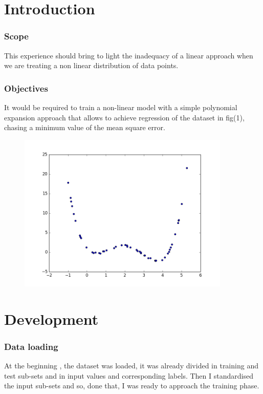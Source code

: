 \documentclass{article}
\begin{document}
			\renewcommand{\lstlistingname}{Code}

			
			\part{Introduction}
			
				\section{Scope}
This experience should bring to light the inadequacy of a linear approach when we are treating a non linear distribution of data points.
				\section{Objectives}
				It would be required to train a non-linear model with a simple polynomial expansion approach that allows to achieve regression of the dataset in fig(1), chasing a minimum value of the mean square error. 
				\begin{center}
\begin{figure}
\centering
\includegraphics[width=0.9\textwidth]{data-plot}
\caption{}
\label{fig:1}
\end{figure}
\end{center}

\newpage
			\part{Development}
				\section{Data loading}
	At  the beginning , the dataset was loaded, it was already divided in training and test sub-sets and in input values and corresponding labels.
	Then I standardised the input sub-sets and so, done that, I was ready to approach the training phase.
	
\end{document}

